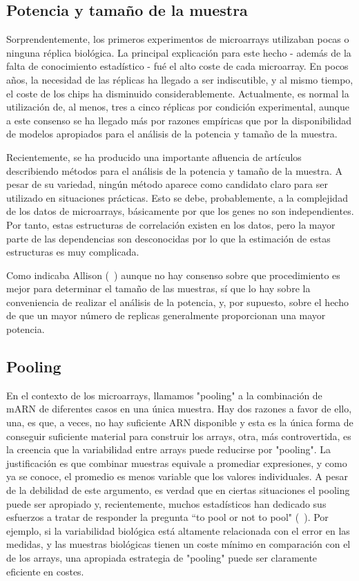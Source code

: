 \subsection{Potencia y tama\~no de la muestra\label{samplesize}}

Sorprendentemente, los primeros experimentos de microarrays utilizaban pocas o
ninguna r\'eplica biol\'ogica. La principal explicaci\'on para este hecho - adem\'as
de la falta de conocimiento estad\'istico - fu\'e el alto coste de cada microarray.
En pocos a\~nos, la necesidad de las r\'eplicas ha llegado a ser indiscutible, y al
mismo tiempo, el coste de los chips ha disminuido considerablemente. Actualmente,
es normal la utilizaci\'on de, al menos, tres a cinco r\'eplicas por condici\'on
experimental, aunque a este consenso se ha llegado m\'as por razones emp\'iricas que
por la disponibilidad de modelos apropiados para el an\'alisis de la potencia y
tama\~no de la muestra.

Recientemente, se ha producido una importante afluencia de art\'iculos describiendo
m\'etodos para el an\'alisis de la potencia y tama\~no de la muestra. A pesar de su
variedad, ning\'un m\'etodo aparece como candidato claro para ser utilizado en
situaciones pr\'acticas. Esto se debe, probablemente, a la complejidad de los
datos de microarrays, b\'asicamente por que los genes no son independientes. Por
tanto, estas estructuras de correlaci\'on existen en los datos, pero la mayor parte
de las dependencias son desconocidas por lo que la estimaci\'on de estas estructuras
es muy complicada.

Como indicaba Allison (~\cite{Allison:2006a}) aunque no hay consenso sobre que
procedimiento es mejor para determinar el tama\~no de las muestras, s\'i que lo hay
sobre la conveniencia de realizar el an\'alisis de la potencia, y, por supuesto,
sobre el hecho de que un mayor n\'umero de replicas generalmente proporcionan
una mayor potencia.

\subsection{Pooling\label{pooling}}

En el contexto de los microarrays, llamamos "pooling" a la combinaci\'on de mARN
de diferentes casos en una \'unica muestra. Hay dos razones a favor de ello, una,
es que, a veces, no hay suficiente ARN disponible y esta es la \'unica forma de
conseguir suficiente material para construir los arrays, otra, m\'as controvertida,
es la creencia que la variabilidad entre arrays puede reducirse por "pooling".
La justificaci\'on es que combinar muestras equivale a promediar expresiones, y
como ya se conoce, el promedio es menos variable que los valores individuales. A
pesar de la debilidad de este argumento, es verdad que en ciertas situaciones el
pooling puede ser apropiado y, recientemente, muchos estad\'isticos han dedicado
sus esfuerzos a tratar de responder la pregunta ``to pool or not to pool"
(~\cite{Kerr:2001a}). Por ejemplo, si la variabilidad biol\'ogica est\'a altamente
relacionada con el error en las medidas, y las muestras biol\'ogicas tienen un
coste m\'inimo en comparaci\'on con el de los arrays, una apropiada estrategia de
"pooling" puede ser claramente eficiente en costes.

